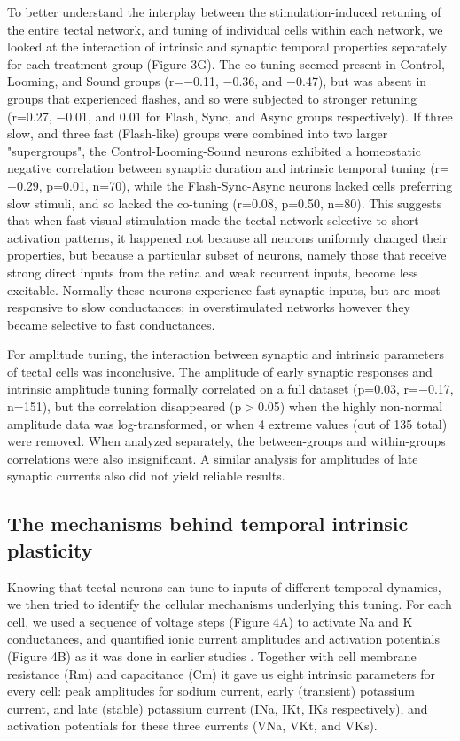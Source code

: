 \documentclass{article}
\begin{document}
To better understand the interplay between the stimulation-induced retuning of the entire tectal network, and tuning of individual cells within each network, we looked at the interaction of intrinsic and synaptic temporal properties separately for each treatment group (Figure 3G). The co-tuning seemed present in Control, Looming, and Sound groups (r=$-$0.11, $-$0.36, and $-$0.47), but was absent in groups that experienced flashes, and so were subjected to stronger retuning (r=0.27, $-$0.01, and 0.01 for Flash, Sync, and Async groups respectively). If three slow, and three fast (Flash-like) groups were combined into two larger "supergroups", the Control-Looming-Sound neurons exhibited a homeostatic negative correlation between synaptic duration and intrinsic temporal tuning (r=$-$0.29, p=0.01, n=70), while the Flash-Sync-Async neurons lacked cells preferring slow stimuli, and so lacked the co-tuning (r=0.08, p=0.50, n=80). This suggests that when fast visual stimulation made the tectal network selective to short activation patterns, it happened not because all neurons uniformly changed their properties, but because a particular subset of neurons, namely those that receive strong direct inputs from the retina and weak recurrent inputs, become less excitable. Normally these neurons experience fast synaptic inputs, but are most responsive to slow conductances; in overstimulated networks however they became selective to fast conductances.

For amplitude tuning, the interaction between synaptic and intrinsic parameters of tectal cells was inconclusive. The amplitude of early synaptic responses and intrinsic amplitude tuning formally correlated on a full dataset (p=0.03, r=$-$0.17, n=151), but the correlation disappeared (p$>$0.05) when the highly non-normal amplitude data was log-transformed, or when 4 extreme values (out of 135 total) were removed. When analyzed separately, the between-groups and within-groups correlations were also insignificant. A similar analysis for amplitudes of late synaptic currents also did not yield reliable results.

\subsection*{The mechanisms behind temporal intrinsic plasticity}

Knowing that tectal neurons can tune to inputs of different temporal dynamics, we then tried to identify the cellular mechanisms underlying this tuning. For each cell, we used a sequence of voltage steps (Figure 4A) to activate Na and K conductances, and quantified ionic current amplitudes and activation potentials (Figure 4B) as it was done in earlier studies \citep{ciarleglio2015}. Together with cell membrane resistance (Rm) and capacitance (Cm) it gave us eight intrinsic parameters for every cell: peak amplitudes for sodium current, early (transient) potassium current, and late (stable) potassium current (INa, IKt, IKs respectively), and activation potentials for these three currents (VNa, VKt, and VKs). 
\end{document}
